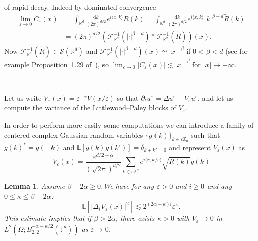 \documentclass[a4paper,11pt]{article}
\newcommand{\mathd}{\mathrm{d}}
\newtheorem{lemma}{Lemma}
{\theorembodyfont{\rmfamily}\newtheorem{remark}{Remark}}
\newcommand{\CF}{\mathscr{F}}
\newcommand{\CS}{\mathscr{S}}
\begin{document}
of rapid decay. Indeed by dominated convergence
\begin{align*}
   \lim_{\varepsilon \rightarrow 0} C_{\varepsilon} (x) & = \int_{\mathbb{R}^d} \frac{\mathd k}{(2 \pi)^{d / 2}} e^{i \langle x, k \rangle} R (k) = \int_{\mathbb{R}^d} \frac{\mathd k}{(2 \pi)^{d / 2}} e^{i \langle x, k \rangle} | k |^{\beta - d} \tilde{R} (k) \\
    & = (2 \pi)^{d / 2} \left( \CF^{- 1}_{\mathbb{R}^d} (| \cdot |^{\beta - d}) \ast \CF_{\mathbb{R}^d}^{- 1} (\tilde{R}) \right) (x) .
\end{align*}
Now $\CF^{- 1}_{\mathbb{R}^d} (\tilde{R}) \in \CS (\mathbb{R}^d)$ and
$\CF^{- 1}_{\mathbb{R}^d} (| \cdot |^{\beta - d}) (x) \simeq | x |^{- \beta}$
if $0 < \beta < d$ (see for example Proposition~1.29 of~{\cite{Bahouri2011}}),
so $\lim_{\varepsilon \rightarrow 0} | C_{\varepsilon} (x) | \lesssim | x |^{-
\beta}$ for $| x | \rightarrow + \infty$.

\

Let us write $V_{\varepsilon} (x) = \varepsilon^{- \alpha} V (x /
\varepsilon)$ so that $\partial_t u^{\varepsilon} = \Delta u^{\varepsilon} +
V_{\varepsilon} u^{\varepsilon}$, and let us compute the variance of the
Littlewood--Paley blocks of $V_{\varepsilon}$.

In order to perform more easily some computations we can introduce a family of
centered complex Gaussian random variables $\{ g (k) \}_{k \in \varepsilon
\mathbb{Z}_0}$ such that $g (k)^{\ast} = g (- k)$ and $\mathbb{E} [g (k) g
(k')] = \delta_{k + k' = 0}$ and represent $V_{\varepsilon} (x)$ as
\[ V_{\varepsilon} (x) = \frac{\varepsilon^{d / 2 - \alpha}}{\left( \sqrt{2
   \pi} \right)^{d / 2}} \sum_{k \in \varepsilon \mathbb{Z}^d} e^{i \langle
   x, k / \varepsilon \rangle} \sqrt{R (k)} g (k) \]


\begin{lemma}
  Assume $\beta - 2 \alpha \geqslant 0$.We have for any $\varepsilon > 0$ and
  $i \geqslant 0$ and any $0 \leqslant \kappa \leqslant \beta - 2 \alpha$:
  \[ \mathbb{E} [| \Delta_i V_{\varepsilon} (x) |^2] \lesssim 2^{(2 \alpha +
     \kappa) i} \varepsilon^{\kappa} . \]
  This estimate implies that if $\beta > 2 \alpha$, there exists $\kappa > 0$
  with $V_{\varepsilon} \rightarrow 0$ in $L^2 (\Omega ; B^{- \alpha - \kappa
  / 2}_{2, 2} (\mathbb{T}^d))$ as $\varepsilon \rightarrow 0$.
\end{lemma}
\end{document}
